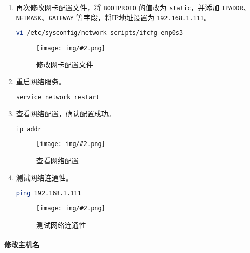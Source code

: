 \documentclass{article}
\newenvironment{enum}{
    \begin{enumerate}[label=(\arabic*), noitemsep]
}{
    \end{enumerate}
}
\newcommand{\img}[3][0.9]{%
    \begin{figure}[H]
        \centering
        \texttt{[image: img/\#2.png]}
        \caption{#3}
    \end{figure}
}
\newcommand{\subsubsubsection}[1]{\paragraph{#1}\mbox{}}
\begin{document}
\begin{enum}
    可以看到，分配的 IP 地址为 \texttt{192.168.1.111}。

    \item 再次修改网卡配置文件，将 \texttt{BOOTPROTO} 的值改为 \texttt{static}，并添加 \texttt{IPADDR}、\texttt{NETMASK}、\texttt{GATEWAY} 等字段，将IP地址设置为 \texttt{192.168.1.111}。
    
    \begin{lstlisting}[language=bash]
    vi /etc/sysconfig/network-scripts/ifcfg-enp0s3
    \end{lstlisting}

    \img[0.8]{1.2.1.6}{修改网卡配置文件}

    \item 重启网络服务。
    
    \begin{lstlisting}[language=bash]
    service network restart
    \end{lstlisting}

    \item 查看网络配置，确认配置成功。
    
    \begin{lstlisting}[language=bash]
    ip addr
    \end{lstlisting}

    \img[0.8]{1.2.1.7}{查看网络配置}

    \item 测试网络连通性。
    
    \begin{lstlisting}[language=bash]
    ping 192.168.1.111
    \end{lstlisting}

    \img{1.2.1.8}{测试网络连通性}
\end{enum}

\subsubsubsection{修改主机名}
\end{document}
